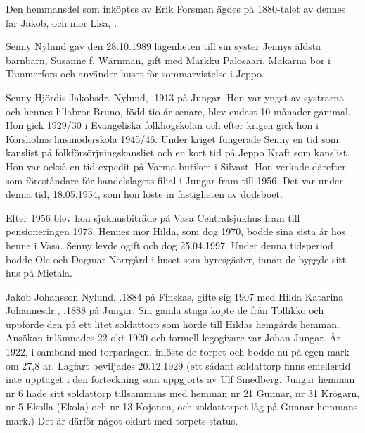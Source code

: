 Den hemmansdel som inköptes av Erik Forsman ägdes på 1880-talet av dennes far Jakob,  och mor Lisa, .




Senny Nylund gav den 28.10.1989 lägenheten till sin syster Jennys äldsta barnbarn, Susanne f. Wärnman, gift med Markku Palosaari. Makarna bor i Tammerfors och använder huset för sommarvistelse i Jeppo.


Senny Hjördis Jakobsdr. Nylund, .1913 på Jungar. Hon var yngst av systrarna och hennes lillabror Bruno, född tio år senare, blev endast 10 månader gammal. Hon gick 1929/30 i Evangeliska folkhögskolan och efter krigen gick hon i Korsholms husmoderskola 1945/46. Under kriget fungerade Senny en tid som kanslist på folkförsörjningskansliet och en kort tid på Jeppo Kraft som kanslist. Hon var också en tid expedit på Varma-butiken i Silvast. Hon verkade därefter som föreståndare för handelslagets filial i Jungar fram till 1956.  Det var under denna tid, 18.05.1954, som hon löste  in fastigheten av dödsboet.

Efter 1956 blev hon sjukhusbiträde på Vasa Centralsjukhus fram till pensioneringen 1973. Hennes mor Hilda, som dog 1970, bodde sina sista år hos henne i Vasa. Senny levde ogift och  dog  25.04.1997. Under denna tidsperiod bodde Ole och Dagmar Norrgård i huset som hyresgäster, innan de byggde sitt hus på Mietala.


Jakob Johansson Nylund, .1884 på Finskas, gifte sig 1907 med Hilda Katarina Johannesdr., .1888 på Jungar. Sin gamla stuga köpte de från Tollikko och uppförde den på ett litet soldattorp som hörde till Hildas hemgårds hemman. Ansökan inlämnades 22 okt 1920 och formell legogivare var Johan Jungar. År 1922, i samband med torparlagen, inlöste de torpet och bodde nu på egen mark om 27,8 ar. Lagfart beviljades 20.12.1929 (ett sådant soldattorp finns emellertid inte upptaget i den förteckning som uppgjorts av Ulf Smedberg. Jungar hemman nr 6 hade sitt soldattorp tillsammans med hemman nr 21 Gunnar, nr 31 Krögarn, nr 5 Ekolla (Ekola) och nr 13 Kojonen, och soldattorpet  låg på Gunnar hemmans mark.) Det är därför något oklart med torpets status.


